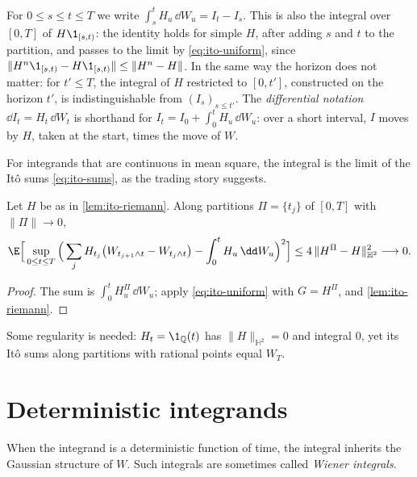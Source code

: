 \begin{remark}[Notation]\label{rem:ito-notation}
For $0\le s\le t\le T$ we write $\int_s^tH_u\,\dd W_u=I_t-I_s$. This is also the integral over
$[0,T]$ of $H\1_{[s,t)}$: the identity holds for simple $H$, after adding $s$ and $t$ to the
partition, and passes to the limit by \eqref{eq:ito-uniform}, since
$\|H^n\1_{[s,t)}-H\1_{[s,t)}\|\le\|H^n-H\|$. In the same way the horizon does not matter: for
$t'\le T$, the integral of $H$ restricted to $[0,t']$, constructed on the horizon $t'$, is
indistinguishable from $(I_s)_{s\le t'}$. The \emph{differential notation}
$\dd I_t=H_t\,\dd W_t$ is shorthand for $I_t=I_0+\int_0^tH_u\,\dd W_u$: over a short
interval, $I$ moves by $H$, taken at the start, times the move of $W$.
\end{remark}

For integrands that are continuous in mean square, the integral is the limit of the It\^o
sums \eqref{eq:ito-sums}, as the trading story suggests.

\begin{corollary}\label{cor:ito-riemann}
Let $H$ be as in \cref{lem:ito-riemann}. Along partitions $\Pi=\{t_j\}$ of $[0,T]$ with
$\|\Pi\|\to0$,
\[
  \E\Big[\sup_{0\le t\le T}\Big(\sum_jH_{t_j}\big(W_{t_{j+1}\wedge t}-W_{t_j\wedge t}\big)
  -\int_0^tH_u\,\dd W_u\Big)^2\Big]\le4\,\|H^\Pi-H\|_{\mathbb H^2}^2\longrightarrow0 .
\]
\end{corollary}

\begin{proof}
The sum is $\int_0^tH^\Pi_u\,\dd W_u$; apply \eqref{eq:ito-uniform} with $G=H^\Pi$, and
\cref{lem:ito-riemann}.
\end{proof}

Some regularity is needed: $H_t=\1_{\mathbb Q}(t)$ has $\|H\|_{\mathbb H^2}=0$ and integral
$0$, yet its It\^o sums along partitions with rational points equal $W_T$.

\section{Deterministic integrands}\label{sec:ito-deterministic}

When the integrand is a deterministic function of time, the integral inherits the Gaussian
structure of $W$. Such integrals are sometimes called \emph{Wiener integrals}.

